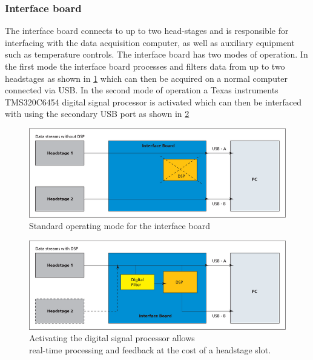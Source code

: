\subsubsection{Interface board}
The interface board connects to up to two head-stages and is responsible for interfacing
with the data acquisition computer, as well as auxiliary equipment such as temperature
controls.
The interface board has two modes of operation.
In the first mode the interface board processes and filters data from up to two
headstages as shown in \ref{fig:IFB_regular} which can then be acquired on a normal
computer connected via USB.
In the second mode of operation a Texas instruments TMS320C6454 digital signal
processor is activated which can then be interfaced with using the secondary USB
port as shown in \ref{fig:IFB_DSP}
\begin{figure}[h!]
    \includegraphics[width=\linewidth]{images/regular_operation.png}
    \caption{Standard operating mode for the interface board}
    \label{fig:IFB_regular}
\end{figure}
\begin{figure}[h!]
    \includegraphics[width=\linewidth]{images/dsp_operation.png}
    \caption{Activating the digital signal processor allows\\
    real-time processing and feedback at the cost of a headstage slot.}
    \label{fig:IFB_DSP}
\end{figure}
